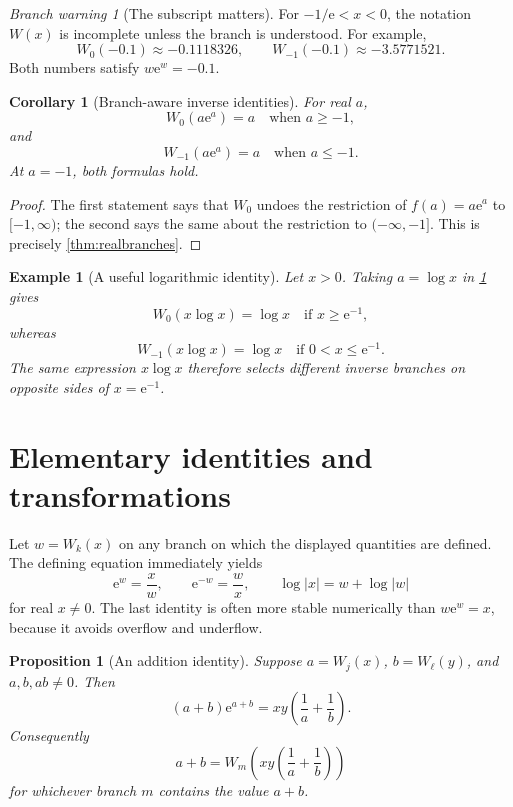 \documentclass[11pt]{article}
\newtheorem{proposition}[proposition]{Proposition}
\newtheorem{corollary}[corollary]{Corollary}
\newtheorem{example}[example]{Example}
\theoremstyle{remark}
\newtheorem{warning}[warning]{Branch warning}
\newcommand{\Wz}{W_0}
\newcommand{\Wm}{W_{-1}}
\newcommand{\ee}{\mathrm e}
\newcommand{\abs}[1]{\left|#1\right|}
\begin{document}
\begin{warning}[The subscript matters]\label{warn:branch}
For \(-1/\ee<x<0\), the notation \(W(x)\) is incomplete unless the branch is
understood.  For example,
\[
 \Wz(-0.1)\approx-0.1118326,\qquad
 \Wm(-0.1)\approx-3.5771521.
\]
Both numbers satisfy \(w\ee^w=-0.1\).
\end{warning}

\begin{corollary}[Branch-aware inverse identities]\label{cor:inverse}
For real \(a\),
\[
 \Wz(a\ee^a)=a\quad\text{when }a\geq-1,
\]
and
\[
 \Wm(a\ee^a)=a\quad\text{when }a\leq-1.
\]
At \(a=-1\), both formulas hold.
\end{corollary}

\begin{proof}
The first statement says that \(\Wz\) undoes the restriction of
\(f(a)=a\ee^a\) to \([-1,\infty)\); the second says the same about the
restriction to \((-\infty,-1]\).  This is precisely
\cref{thm:realbranches}.
\end{proof}

\begin{example}[A useful logarithmic identity]\label{ex:xlogx}
Let \(x>0\).  Taking \(a=\log x\) in \cref{cor:inverse} gives
\[
 \Wz(x\log x)=\log x\quad\text{if }x\geq\ee^{-1},
\]
whereas
\[
 \Wm(x\log x)=\log x\quad\text{if }0<x\leq\ee^{-1}.
\]
The same expression \(x\log x\) therefore selects different inverse branches
on opposite sides of \(x=\ee^{-1}\).
\end{example}

\section{Elementary identities and transformations}\label{sec:identities}

Let \(w=W_k(x)\) on any branch on which the displayed quantities are defined.
The defining equation immediately yields
\begin{equation}\label{eq:basicidentities}
 \ee^w=\frac{x}{w},\qquad
 \ee^{-w}=\frac{w}{x},\qquad
 \log\abs{x}=w+\log\abs{w}
\end{equation}
for real \(x\neq0\).  The last identity is often more stable numerically than
\(w\ee^w=x\), because it avoids overflow and underflow.

\begin{proposition}[An addition identity]\label{prop:addition}
Suppose \(a=W_j(x)\), \(b=W_\ell(y)\), and \(a,b,ab\neq0\).  Then
\begin{equation}\label{eq:addition}
 (a+b)\ee^{a+b}
   =xy\left(\frac1a+\frac1b\right).
\end{equation}
Consequently
\[
 a+b=W_m\left(xy\left(\frac1a+\frac1b\right)\right)
\]
for whichever branch \(m\) contains the value \(a+b\).
\end{proposition}
\end{document}
